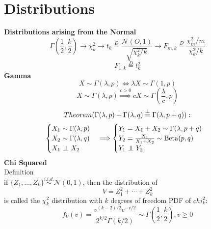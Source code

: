 \documentclass[twocolumn]{amsart}
\newcommand{\Beta}{\operatorname{Beta}}
\newcommand\independent{\protect\mathpalette{\protect\independenT}{\perp}}
\def\independenT#1#2{\mathrel{\rlap{$#1#2$}\mkern3mu{#1#2}}}
\begin{document}
\section*{Distributions}
\textbf{Distributions arising from the Normal}
\begin{equation*}
  \Gamma(\frac{1}{2},\frac{k}{2})
  \rightarrow \chi_{k}^{2}
  \rightarrow t_{k}
  \stackrel{D}{=} \frac{\mathcal{N}(O, 1)}{\sqrt{\chi_{k}^{2}/k}}
  \rightarrow F_{m,k}
  \stackrel{D}{=} \frac{\chi_{m}^{2}/m}{\chi_{k}^{2}/k}
\end{equation*}
\begin{equation*}
  F_{1,k} \stackrel{D}{=} t_{k}^{2}
\end{equation*}
\textbf{Gamma}
\begin{equation*}
  X \sim \Gamma(\lambda,p) \Longleftrightarrow \lambda X \sim \Gamma(1, p)
\end{equation*}
\begin{equation*}
  X \sim \Gamma(\lambda,p) \overset{c>0}{\Longrightarrow} c X \sim \Gamma(\frac{\lambda}{c},p)
\end{equation*}
\begin{equation*}
  Theorem (\Gamma(\lambda, p) + \Gamma(\lambda, q) \overset{\independent}{=} \Gamma(\lambda,p+q)):
\end{equation*}
\begin{equation*}
  \begin{cases}
    X_{1} \sim \Gamma(\lambda,p) \\
    X_{2} \sim \Gamma(\lambda,q) \\
    X_{1} \independent X_{2}
  \end{cases}
  \Longrightarrow
  \begin{cases}
    Y_{1} = X_{1} + X_{2} \sim \Gamma(\lambda, p + q) \\
    Y_{2} = \frac{X_{1}}{X_{1} + X_{2}} \sim \Beta(p, q) \\
    Y_{1} \independent Y_{2}
  \end{cases}
\end{equation*}
\textbf{Chi Squared}\\
Definition \\
if \(\{Z_{1},\ldots,Z_{k}\} \overset{i.i.d.}{\sim} \mathcal{N}(0,1)\), then the distribution of
\begin{equation*}
  V = Z_{1}^{2}+\cdots+Z_{k}^{2}
\end{equation*}
is called the \(\chi_{k}^{2}\) distribution with \(k\) degrees of freedom
PDF of \(chi_{k}^{2}\):
\begin{equation*}
  f_{V}(v) = \frac{v^{(k-2)/2}e^{-v/2}}{2^{k/2}\Gamma(k/2)} \sim \Gamma(\frac{1}{2},\frac{k}{2}), v\geq0
\end{equation*}
\end{document}
